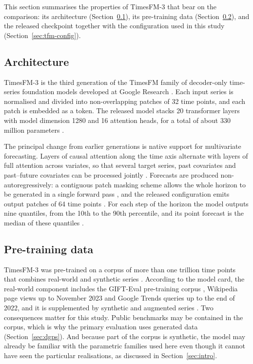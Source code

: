 \documentclass[11pt]{article}
\providecommand{\sectionref}[1]{Section~\ref{#1}}
\begin{document}
This section summarises the properties of TimesFM-3 that bear on the comparison: its
architecture (\sectionref{sec:tfm-architecture}), its pre-training data
(\sectionref{sec:tfm-data}), and the released checkpoint together with the configuration used in
this study (\sectionref{sec:tfm-config}).

\subsection{Architecture}
\label{sec:tfm-architecture}

TimesFM-3 is the third generation of the TimesFM family of decoder-only time-series foundation
models developed at Google Research \citep{das2024timesfm, timesfm3blog}. Each input series is
normalised and divided into non-overlapping patches of 32 time points, and each patch is
embedded as a token. The released model stacks 20 transformer layers with model dimension 1280
and 16 attention heads, for a total of about 330 million parameters
\citep{timesfm3blog, timesfm3card}.

The principal change from earlier generations is native support for multivariate forecasting.
Layers of causal attention along the time axis alternate with layers of full attention across
variates, so that several target series, past covariates and past--future covariates can be
processed jointly \citep{timesfm3blog}. Forecasts are produced non-autoregressively: a contiguous
patch masking scheme allows the whole horizon to be generated in a single forward pass
\citep{timesfm3blog}, and the released configuration emits output patches of 64 time points
\citep{timesfm3card}. For each step of the horizon the model outputs nine quantiles, from the
10th to the 90th percentile, and its point forecast is the median of these quantiles
\citep{timesfm3blog, timesfm3repo}.

\subsection{Pre-training data}
\label{sec:tfm-data}

TimesFM-3 was pre-trained on a corpus of more than one trillion time points that combines
real-world and synthetic series \citep{timesfm3blog}. According to the model card, the
real-world component includes the GIFT-Eval pre-training corpus \citep{aksu2024gifteval},
Wikipedia page views up to November 2023 and Google Trends queries up to the end of 2022, and it
is supplemented by synthetic and augmented series \citep{timesfm3card}. Two consequences matter
for this study. Public benchmarks may be contained in the corpus, which is why the primary
evaluation uses generated data (\sectionref{sec:dgps}). And because part of the corpus is
synthetic, the model may already be familiar with the parametric families used here even though
it cannot have seen the particular realisations, as discussed in \sectionref{sec:intro}.
\end{document}
